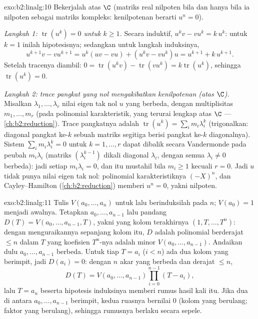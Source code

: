 \begin{solution}{exo:b2:linalg:10}
Bekerjalah atas $\C$ (matriks real nilpoten bila dan hanya bila ia
nilpoten sebagai matriks kompleks: kenilpotenan berarti $u^n = 0$).

\emph{Langkah 1: $\operatorname{tr}(u^k) = 0$ untuk $k \geq 1$.} Secara
induktif, $u^k v - v u^k = k\, u^k$: untuk $k = 1$ inilah
hipotesisnya; sedangkan untuk langkah induksinya,
\[
u^{k+1}v - vu^{k+1} = u^k(uv - vu) + (u^k v - v u^k)u
= u^{k+1} + k\,u^{k+1} .
\]
Setelah tracenya diambil: $0 = \operatorname{tr}(u^k v) -
\operatorname{tr}(vu^k) = k \operatorname{tr}(u^k)$, sehingga
$\operatorname{tr}(u^k) = 0$.

\emph{Langkah 2: trace pangkat yang nol mengakibatkan kenilpotenan (atas
$\C$).} Misalkan $\lambda_1, \dots, \lambda_r$ nilai eigen tak nol $u$
yang berbeda, dengan multiplisitas $m_1, \dots, m_r$ (pada polinomial
karakteristik, yang terurai lengkap atas $\C$ ---
\cref{ch:b2:reduction}). Trace pangkatnya adalah $\operatorname{tr}(u^k) =
\sum_i m_i \lambda_i^k$ (trigonalkan: diagonal pangkat ke-$k$ sebuah
matriks segitiga berisi pangkat ke-$k$ diagonalnya). Sistem $\sum_i m_i
\lambda_i^k = 0$ untuk $k = 1, \dots, r$ dapat dibalik secara Vandermonde
pada peubah $m_i\lambda_i$ (matriks $(\lambda_i^{k-1})$ dikali
diagonal $\lambda_i$, dengan semua $\lambda_i \neq 0$ berbeda): jadi
setiap $m_i \lambda_i = 0$, dan itu mustahil bila $m_i \geq 1$ kecuali
$r = 0$. Jadi $u$ tidak punya nilai eigen tak nol: polinomial
karakteristiknya $(-X)^n$, dan Cayley--Hamilton (\cref{ch:b2:reduction})
memberi $u^n = 0$, yakni nilpoten.
\end{solution}

\begin{solution}{exo:b2:linalg:11}
Tulis $V(a_0, \dots, a_n)$ untuk  lalu berinduksilah pada
$n$; $V(a_0) = 1$ menjadi awalnya. Tetapkan $a_0, \dots, a_{n-1}$ lalu
pandang $D(T) = V(a_0, \dots, a_{n-1}, T)$, yakni  yang kolom
terakhirnya $(1, T, \dots, T^n)$: dengan menguraikannya sepanjang kolom
itu, $D$ adalah polinomial berderajat $\leq n$ dalam $T$ yang koefisien
$T^n$-nya adalah minor $V(a_0, \dots, a_{n-1})$. Andaikan dulu $a_0,
\dots, a_{n-1}$ berbeda. Untuk tiap $T = a_i$ ($i < n$) ada dua kolom
yang berimpit, jadi $D(a_i) = 0$: dengan $n$ akar yang berbeda dan
derajat $\leq n$,
\[
D(T) = V(a_0, \dots, a_{n-1}) \prod_{i=0}^{n-1}(T - a_i),
\]
lalu $T = a_n$ beserta hipotesis induksinya memberi rumus hasil kali
itu. Jika dua di antara $a_0, \dots, a_{n-1}$ berimpit, kedua ruasnya
bernilai $0$ (kolom yang berulang; faktor yang berulang), sehingga
rumusnya berlaku secara sepele.
\end{solution}

